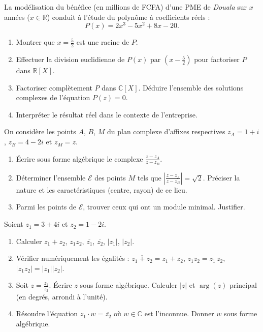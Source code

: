 \documentclass[11pt]{article}
\begin{document}
\begin{exercice}
La modélisation du bénéfice (en millions de FCFA) d'une PME de \textit{Douala} sur $x$ années ($x \in \mathbb{R}$) conduit à l'étude du polynôme à coefficients réels :
$$P(x) = 2x^3 - 5x^2 + 8x - 20.$$
\begin{enumerate}
    \item Montrer que $x = \frac{5}{2}$ est une racine de $P$.
    \item Effectuer la division euclidienne de $P(x)$ par $\left(x - \frac{5}{2}\right)$ pour factoriser $P$ dans $\mathbb{R}[X]$.
    \item Factoriser complètement $P$ dans $\mathbb{C}[X]$. Déduire l'ensemble des solutions complexes de l'équation $P(z) = 0$.
    \item Interpréter le résultat réel dans le contexte de l'entreprise.
\end{enumerate}
\end{exercice}

\begin{exercice}
On considère les points $A$, $B$, $M$ du plan complexe d'affixes respectives $z_A = 1+i$, $z_B = 4-2i$ et $z_M = z$.
\begin{enumerate}
    \item Écrire sous forme algébrique le complexe $\frac{z - z_A}{z - z_B}$.
    \item Déterminer l'ensemble $\mathcal{E}$ des points $M$ tels que $\left|\frac{z - z_A}{z - z_B}\right| = \sqrt{2}$. Préciser la nature et les caractéristiques (centre, rayon) de ce lieu.
    \item Parmi les points de $\mathcal{E}$, trouver ceux qui ont un module minimal. Justifier.
\end{enumerate}
\end{exercice}

\begin{exercice}
Soient $z_1 = 3 + 4i$ et $z_2 = 1 - 2i$.
\begin{enumerate}
    \item Calculer $z_1 + z_2$, $z_1 z_2$, $\overline{z_1}$, $\overline{z_2}$, $|z_1|$, $|z_2|$.
    \item Vérifier numériquement les égalités : $\overline{z_1 + z_2} = \overline{z_1} + \overline{z_2}$, $\overline{z_1 z_2} = \overline{z_1}\,\overline{z_2}$, $|z_1 z_2| = |z_1||z_2|$.
    \item Soit $z = \frac{z_1}{z_2}$. Écrire $z$ sous forme algébrique. Calculer $|z|$ et $\arg(z)$ principal (en degrés, arrondi à l'unité).
    \item Résoudre l'équation $z_1 \cdot w = \overline{z_2}$ où $w \in \mathbb{C}$ est l'inconnue. Donner $w$ sous forme algébrique.
\end{enumerate}
\end{exercice}
\end{document}
